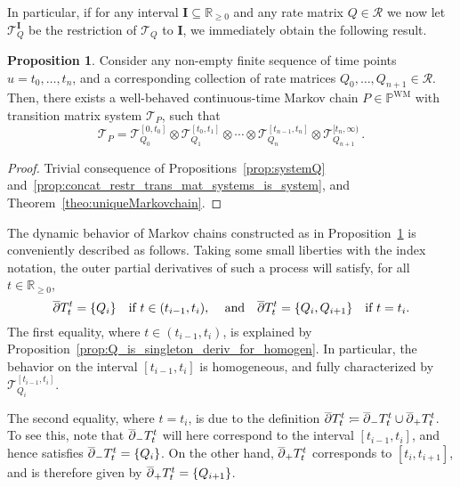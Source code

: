 \documentclass[10pt,a4paper]{paper}
\theoremstyle{definition}
\newtheorem{proposition}[theorem]{Proposition}
\newcommand{\reals}{\mathbb{R}}
\newcommand{\realsnonneg}{\reals_{\geq 0}}
\newcommand{\processes}{\mathbb{P}}
\newcommand{\wmprocesses}{\processes^{\mathrm{WM}}}
\newcommand{\coloneqq}{:\!=}
\begin{document}
In particular, if for any interval $\mathbf{I}\subseteq\realsnonneg$ and any rate matrix $Q\in\mathcal{R}$ we now let $\mathcal{T}_Q^{\mathbf{I}}$ be the restriction of $\mathcal{T}_Q$ to $\mathbf{I}$, we immediately obtain the following result.

\begin{proposition}\label{prop:finite_different_rate_matrix_has_process}
Consider any non-empty finite sequence of time points $u=t_0,\ldots,t_n$, and a corresponding collection of rate matrices $Q_0,\ldots,Q_{n+1}\in\mathcal{R}$. Then, there exists a well-behaved continuous-time Markov chain $P\in\wmprocesses$ with transition matrix system $\mathcal{T}_P$, such that
\begin{equation*}
\mathcal{T}_P = \mathcal{T}_{Q_0}^{[0,t_0]}\otimes \mathcal{T}_{Q_1}^{[t_0,t_1]} \otimes \cdots \otimes \mathcal{T}_{Q_n}^{[t_{n-1},t_n]} \otimes \mathcal{T}_{Q_{n+1}}^{[t_n,\infty)}\,.
\end{equation*}
\end{proposition}
\begin{proof}
Trivial consequence of Propositions~\ref{prop:systemQ} and~\ref{prop:concat_restr_trans_mat_systems_is_system}, and Theorem~\ref{theo:uniqueMarkovchain}.
\end{proof}

The dynamic behavior of Markov chains constructed as in Proposition~\ref{prop:finite_different_rate_matrix_has_process} is conveniently described as follows. Taking some small liberties with the index notation, the outer partial derivatives of such a process will satisfy, for all $t\in\realsnonneg$,
\begin{equation*}
\smash{\overline{\partial}} T_t^t = \{Q_i\}\quad\text{if $t\in(t_{i-1},t_i)$,~~~~and}\quad \smash{\overline{\partial}} T_t^t = \{Q_i,Q_{i+1}\}\quad\text{if $t=t_i$.}
\end{equation*}
The first equality, where $t\in(t_{i-1},t_i)$, is explained by Proposition~\ref{prop:Q_is_singleton_deriv_for_homogen}. In particular, the behavior on the interval $[t_{i-1},t_i]$ is homogeneous, and fully characterized by $\mathcal{T}_{Q_i}^{[t_{i-1},t_i]}$.

The second equality, where $t=t_i$, is due to the definition $\smash{\overline{\partial}}T_t^t\coloneqq \smash{\overline{\partial}}_-T_t^t\cup \smash{\overline{\partial}}_+T_t^t$. To see this, note that $\smash{\overline{\partial}}_-T_t^t$ will here correspond to the interval $[t_{i-1}, t_i]$, and hence satisfies $\smash{\overline{\partial}}_-T_t^t=\{Q_i\}$. On the other hand, $\smash{\overline{\partial}}_+T_t^t$ corresponds to $[t_i,t_{i+1}]$, and is therefore given by $\smash{\overline{\partial}}_+T_t^t=\{Q_{i+1}\}$.
\end{document}
